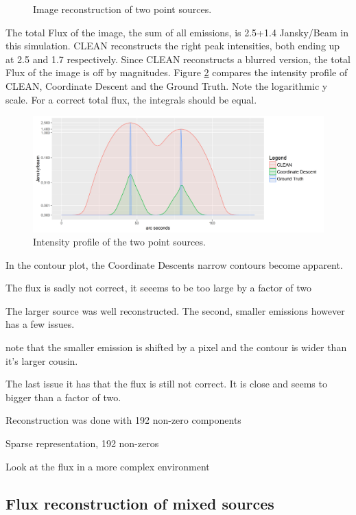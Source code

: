 \begin{figure}[h]
	\caption{Image reconstruction of two point sources.}
	\label{results:points}
\end{figure}

The total Flux of the image, the sum of all emissions, is 2.5+1.4 Jansky/Beam in this simulation. CLEAN reconstructs the right peak intensities, both ending up at 2.5 and 1.7 respectively. Since CLEAN reconstructs a blurred version, the total Flux of the image is off by magnitudes. Figure \ref{results:points:contour} compares the intensity profile of CLEAN, Coordinate Descent and the Ground Truth. Note the logarithmic y scale. For a correct total flux, the integrals should be equal. 

\begin{figure}[h]
	\centering
	\includegraphics[width=0.8\linewidth]{./chapters/20.results/points/contour_points.png}
	\caption{Intensity profile of the two point sources.}
	\label{results:points:contour}
\end{figure}

In the contour plot, the Coordinate Descents narrow contours become apparent.

The flux is sadly not correct, it seeems to be too large by a factor of two

The larger source was well reconstructed. The second, smaller emissions however has a few issues.

note that the smaller emission is shifted by a pixel and the contour is wider than it's larger cousin. 

The last issue it has that the flux is still not correct. It is close and seems to bigger than a factor of two.

Reconstruction was done with 192 non-zero components

Sparse representation, 192 non-zeros


Look at the flux in a more complex environment


\subsection{Flux reconstruction of mixed sources}

